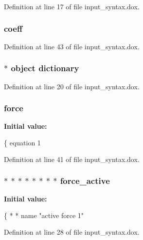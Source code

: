 Definition at line 17 of file input\-\_\-syntax.\-dox.

\hypertarget{input__syntax_8dox_a683c89e90662ba53f43be1061d4e39aa}{
\subsubsection[{coeff}]{\setlength{\rightskip}{0pt plus 5cm}coeff}}\label{input__syntax_8dox_a683c89e90662ba53f43be1061d4e39aa}


Definition at line 43 of file input\-\_\-syntax.\-dox.

\hypertarget{input__syntax_8dox_aae49127e1d788bc3212614cd2848e7f9}{
\subsubsection[{dictionary}]{\setlength{\rightskip}{0pt plus 5cm}$\ast$ object dictionary}}\label{input__syntax_8dox_aae49127e1d788bc3212614cd2848e7f9}


Definition at line 20 of file input\-\_\-syntax.\-dox.

\hypertarget{input__syntax_8dox_ab0a92c70357da47fe86696522eab7dc8}{
\subsubsection[{force}]{\setlength{\rightskip}{0pt plus 5cm}force}}\label{input__syntax_8dox_ab0a92c70357da47fe86696522eab7dc8}
{\bfseries Initial value\-:}
\begin{DoxyCode}
\{
      equation 1
\end{DoxyCode}


Definition at line 41 of file input\-\_\-syntax.\-dox.

\hypertarget{input__syntax_8dox_a09f79fdfedb53de23a0046804e91075d}{
\subsubsection[{force\-\_\-active}]{\setlength{\rightskip}{0pt plus 5cm}$\ast$ $\ast$ $\ast$ $\ast$ $\ast$ $\ast$ $\ast$ $\ast$ force\-\_\-active}}\label{input__syntax_8dox_a09f79fdfedb53de23a0046804e91075d}
{\bfseries Initial value\-:}
\begin{DoxyCode}
\{
*   
*   name \textcolor{stringliteral}{"active force 1"}
\end{DoxyCode}


Definition at line 28 of file input\-\_\-syntax.\-dox.


